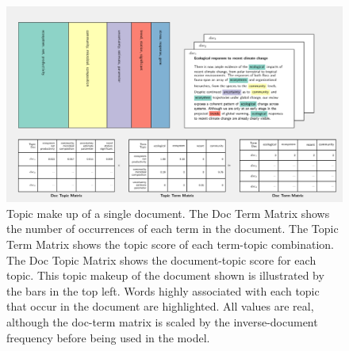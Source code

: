 \documentclass{article}
\begin{document}
\begin{figure}
	\begin{center}
		\includegraphics[width=1\linewidth]{../plots_pub/single_doc_3_536594_1861.pdf}
		\caption{Topic make up of a single document. The Doc Term Matrix shows the number of occurrences of each term in the document. The Topic Term Matrix shows the topic score of each term-topic combination. The Doc Topic Matrix shows the document-topic score for each topic. This topic makeup of the document shown is illustrated by the bars in the top left. Words highly associated with each topic that occur in the document are highlighted. All values are real, although the doc-term matrix is scaled by the inverse-document frequency before being used in the model.}
		\label{doc-topic}
	\end{center}
\end{figure}
\end{document}

